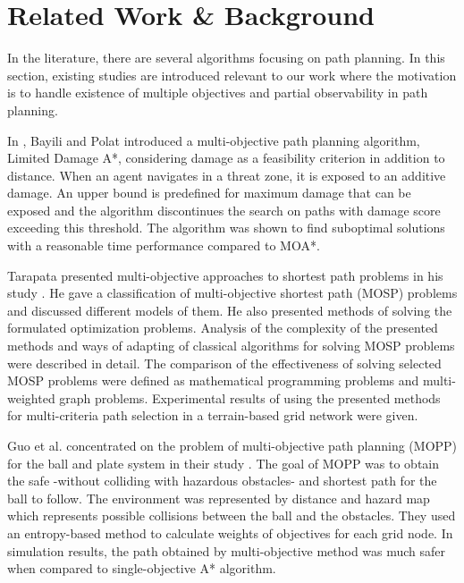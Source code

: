 \documentclass[10pt,journal]{IEEEtran}
\begin{document}
\section{Related Work \& Background}
\label{chapter:relatedwork}

In the literature, there are several algorithms focusing on path planning. In this section, existing studies are introduced relevant to our work where the motivation is to handle existence of multiple objectives and partial observability in path planning.

In  \cite{LDAStarBayili:2008}, Bayili and Polat introduced a multi-objective path planning algorithm, Limited Damage A*,  considering damage as a feasibility criterion in addition to distance. When an agent navigates in a threat zone, it is exposed to an additive damage. An upper bound is predefined for maximum damage that can be exposed and the algorithm discontinues the search on paths with damage score exceeding this threshold. The algorithm was shown to find suboptimal solutions with a reasonable time performance compared to MOA*. 

Tarapata presented multi-objective approaches to shortest path problems in his study \cite{Tarapata:2007}. He gave a classification of multi-objective shortest path (MOSP) problems and discussed different models of them. He also presented methods of solving the formulated optimization problems. Analysis of the complexity of the presented methods and ways of adapting of classical algorithms for solving MOSP problems were described in detail. The comparison of the effectiveness of solving selected MOSP problems were defined as mathematical programming problems and multi-weighted graph problems. Experimental results of using the presented methods for multi-criteria path selection in a terrain-based grid network were given.

Guo et al. concentrated on the problem of multi-objective path planning (MOPP) for the ball and plate system in their study \cite{Guo:2009}. The goal of MOPP was to obtain the safe -without colliding with hazardous obstacles- and shortest path for the ball to follow. The environment was represented by distance and hazard map which represents possible collisions between the ball and the obstacles. They used an entropy-based method to calculate weights of objectives for each grid node. In simulation results, the path obtained by multi-objective method was much safer when compared to single-objective A* algorithm.
\end{document}

